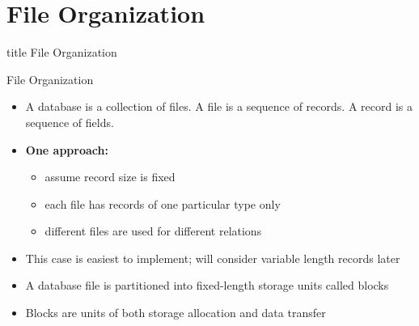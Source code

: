 \documentclass[aspectratio=169, xcolor=dvipsnames]{beamer}
\begin{document}
\section{File Organization}

\begin{frame}
  \vfill
  \centering
  \begin{beamercolorbox}[sep=8pt,center,shadow=true,rounded=true]{title}
    File Organization\par%
  \end{beamercolorbox}
  \vfill
\end{frame}

\begin{frame}{File Organization}
    \begin{block}{}
        \begin{itemize}[<+->]
            \item A database is a collection of files. A file is a sequence of records. A record is a sequence of fields.
            \item \textbf{One approach:}
            \begin{itemize}[<+->]
                \item assume record size is fixed
                \item each file has records of one particular type only
                \item different files are used for different relations
            \end{itemize}
            \item This case is easiest to implement; will consider variable length records later
            \item A database file is partitioned into fixed-length storage units called blocks
            \item Blocks are units of both storage allocation and data transfer
        \end{itemize}
    \end{block}
\end{frame}
\end{document}
